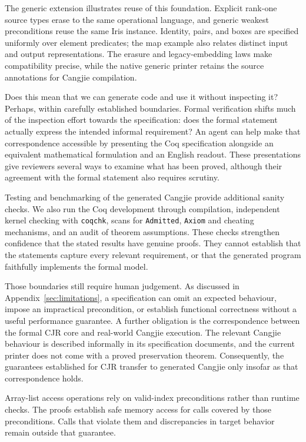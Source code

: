 \documentclass[11pt]{article}
\begin{document}
The generic extension illustrates reuse of this foundation. Explicit
rank-one source types erase to the same operational language, and generic
weakest preconditions reuse the same Iris instance. Identity, pairs, and
boxes are specified uniformly over element predicates; the map example
also relates distinct input and output representations. The erasure and
legacy-embedding laws make compatibility precise, while the native generic
printer retains the source annotations for Cangjie compilation.

Does this mean that we can generate code and use it without inspecting it? Perhaps, within carefully established boundaries. Formal verification shifts much of the inspection effort towards the specification: does the formal statement actually express the intended informal requirement? An agent can help make that correspondence accessible by presenting the Coq specification alongside an equivalent mathematical formulation and an English readout. These presentations give reviewers several ways to examine what has been proved, although their agreement with the formal statement also requires scrutiny.

Testing and benchmarking of the generated Cangjie provide additional sanity checks. We also run the Coq development through compilation, independent kernel checking with \texttt{coqchk}, scans for \texttt{Admitted}, \texttt{Axiom} and cheating mechanisms, and an audit of theorem assumptions. These checks strengthen confidence that the stated results have genuine proofs. They cannot establish that the statements capture every relevant requirement, or that the generated program faithfully implements the formal model.

Those boundaries still require human judgement. As discussed in Appendix~\ref{sec:limitations}, a specification can omit an expected behaviour, impose an impractical precondition, or establish functional correctness without a useful performance guarantee. A further obligation is the correspondence between the formal CJR core and real-world Cangjie execution. The relevant Cangjie behaviour is described informally in its specification documents, and the current printer does not come with a proved preservation theorem. Consequently, the guarantees established for CJR transfer to generated Cangjie only insofar as that correspondence holds.

Array-list access operations rely on valid-index preconditions rather than runtime checks. The proofs establish safe memory access for calls covered by those preconditions. Calls that violate them and discrepancies in target behavior remain outside that guarantee.
\end{document}
